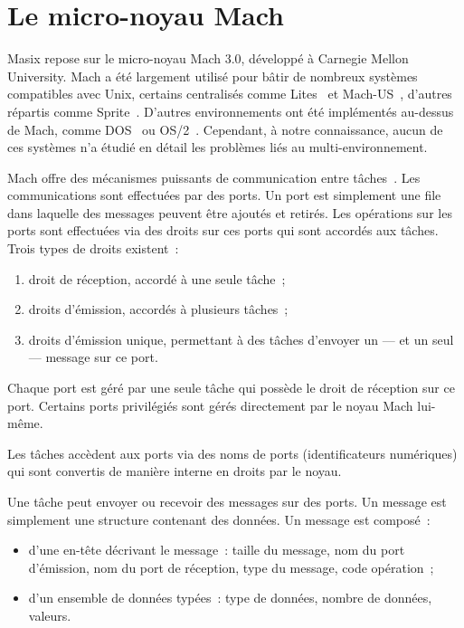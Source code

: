 \section {Le micro-noyau Mach}

Masix repose sur le micro-noyau Mach 3.0, d\'evelopp\'e \`a Carnegie Mellon University.  Mach a \'et\'e largement 
utilis\'e pour b\^atir de nombreux syst\`emes compatibles avec Unix, 
certains centralis\'es comme Lites~\cite{Helander94} et 
Mach-US~\cite{mach-us95}, d'autres r\'epartis comme Sprite~\cite{Kupfer93}. 
D'autres environnements ont \'et\'e impl\'ement\'es au-dessus de Mach, 
comme DOS~\cite{dos91} ou OS/2~\cite{Phelan93}. 
Cependant, \`a notre connaissance, aucun de ces syst\`emes n'a \'etudi\'e 
en d\'etail les probl\`emes li\'es au multi-environnement.

Mach offre des m\'ecanismes puissants de commu\-nication entre 
t\^aches~\cite{Draves90}. Les communications sont effectu\'ees par des ports. Un port est simplement une file dans laquelle des messages peuvent \^etre ajout\'es et retir\'es. 
Les op\'erations sur les ports sont effectu\'ees via des droits sur 
ces ports qui sont accord\'es aux t\^aches. Trois types de droits existent~:
\begin {enumerate}
\item droit de r\'eception, accord\'e \`a une seule t\^ache~;
\item droits d'\'emission, accord\'es \`a plusieurs t\^aches~;
\item droits d'\'emission unique, permettant \`a des t\^aches d'envoyer un ---
et un seul --- message sur ce port.
\end {enumerate}

Chaque port est g\'er\'e par une seule t\^ache qui poss\`ede le droit
de r\'eception sur ce port. Certains ports privil\'egi\'es sont g\'er\'es
directement par le noyau Mach lui-m\^eme.

Les t\^aches acc\`edent aux ports via des noms de ports
(identificateurs num\'eriques) qui sont convertis de mani\`ere interne en
droits par le noyau.

Une t\^ache peut envoyer ou recevoir des messages sur des ports. Un
message est simplement une structure contenant des donn\'ees. Un message
est compos\'e~:
\begin {itemize}
\item d'une en-t\^ete d\'ecrivant le message~: taille du message, nom du port
d'\'emission, nom du port de r\'eception, type du message, code op\'eration~;
\item d'un ensemble de donn\'ees typ\'ees~: type de donn\'ees, nombre de
donn\'ees, valeurs.
\end {itemize}

